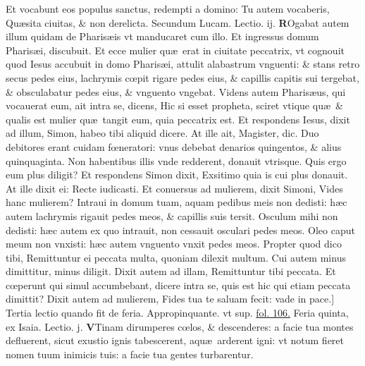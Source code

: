 \documentclass[a5paper,10pt]{book}
\def\leftmarginnote{%
	\lrmarginnote{\hskip -\marginparsep \hskip -6.5em}}
\def\rightmarginnote{%
	\lrmarginnote{\hskip\columnwidth \hskip -1em}}
\def\ae{æ}
\def\oe{œ}
\begin{document}
\begin{multicols*}{2}
Et vocabunt eos populus sanctus, redempti a domino: Tu autem vocaberis, Qu\ae sita ciuitas, \& non derelicta.
\newline \color{red} Secundum Lucam. \hfill Lectio. ij. \color{black}
\vspace{-.25em}
\lettrine[lines=2]{\bfseries \color{red} R}{}\textdagger Ogabat\leftmarginnote{\begin{flushright}c.7.f\end{flushright}} autem illum quidam de Pharis\ae is vt manducaret cum illo.
Et ingressus domum Pharis\ae i, discubuit. Et ecce mulier qu\ae \ erat in ciuitate peccatrix, vt cognouit quod Iesus accubuit in domo Pharis\ae i, attulit alabastrum vnguenti: \& stans retro secus pedes eius, lachrymis c\oe pit rigare pedes eius, \& capillis capitis sui tergebat, \& obsculabatur pedes eius, \& vnguento vngebat.
Videns autem Pharis\ae us, qui vocauerat eum, ait intra se, dicens, Hic si esset propheta, sciret vtique qu\ae \ \& qualis est mulier qu\ae \ tangit eum, quia peccatrix est.
Et respondens Iesus, dixit ad illum, Simon, habeo tibi aliquid dicere. At ille ait, Magister, dic.
Duo debitores erant cuidam f\oe neratori: vnus debebat denarios quingentos, \& 
alius quinquaginta.
Non habentibus illis vnde redderent, donauit vtrisque.
Quis ergo eum plus diligit? Et respondens Simon dixit, Exsitimo quia is cui plus donauit. At ille dixit ei: Recte iudicasti.
Et conuersus ad mulierem, dixit Simoni, Vides hanc mulierem?
Intraui in domum tuam, aquam pedibus meis non dedisti: h\ae c autem lachrymis rigauit pedes meos, \& capillis suis tersit.
Osculum mihi non dedisti: h\ae c autem ex quo intrauit, non cessauit osculari pedes meos.
Oleo caput meum non vnxisti: h\ae c autem vnguento vnxit pedes meos.
Propter quod dico tibi, Remittuntur ei peccata multa, quoniam dilexit multum. Cui autem minus dimittitur, minus diligit.
Dixit autem ad illam, Remittuntur tibi peccata.
Et c\oe perunt qui simul accumbebant, dicere intra se, quis est hic qui etiam peccata dimittit?
Dixit autem ad mulierem, Fides tua te saluam fecit: vade in pace.]
\newline \color{red} Tertia lectio quando fit de feria. \color{black} Appropinquante. \color{red} vt sup. \color{black} \hyperlink{page.106}{fol. 106.}
\newline {} \color{red} \hypertarget{THU-TERTIA-ADV}{Feria quinta,} ex Isaia. \hfill Lectio. j. \color{black}
\vspace{-.25em}
\lettrine[lines=2]{\bfseries V}{}Tinam\rightmarginnote{c. 64.} dirumperes c\oe los, \& descenderes: a facie tua montes defluerent, sicut exustio ignis tabescerent, aqu\ae \ arderent igni: vt notum fieret nomen tuum inimicis tuis: a facie tua gentes turbarentur.

\end{multicols*}
\end{document}
